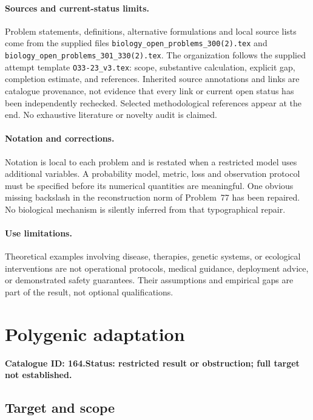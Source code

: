 \documentclass[11pt]{article}
\begin{document}
\paragraph{Sources and current-status limits.}
Problem statements, definitions, alternative formulations and local source lists
come from the supplied files
\texttt{biology\_open\_problems\_300(2).tex} and
\texttt{biology\_open\_problems\_301\_330(2).tex}.
The organization follows the supplied attempt template
\texttt{O33-23\_v3.tex}: scope, substantive calculation, explicit gap,
completion estimate, and references. Inherited source annotations and links are
catalogue provenance, not evidence that every link or current open status has
been independently rechecked. Selected methodological references appear at the
end. No exhaustive literature or novelty audit is claimed.

\paragraph{Notation and corrections.}
Notation is local to each problem and is restated when a restricted model uses
additional variables. A probability model, metric, loss and observation protocol
must be specified before its numerical quantities are meaningful. One obvious
missing backslash in the reconstruction norm of Problem~77 has been repaired.
No biological mechanism is silently inferred from that typographical repair.

\paragraph{Use limitations.}
Theoretical examples involving disease, therapies, genetic systems, or ecological
interventions are not operational protocols, medical guidance, deployment advice,
or demonstrated safety guarantees. Their assumptions and empirical gaps are part
of the result, not optional qualifications.

\setcounter{section}{163}
\section{Polygenic adaptation}
\label{prob:164}
\noindent\textbf{Catalogue ID: 164.}\quad \textbf{Status: restricted result or obstruction; full target not established.}
\subsection{Target and scope}
\end{document}
